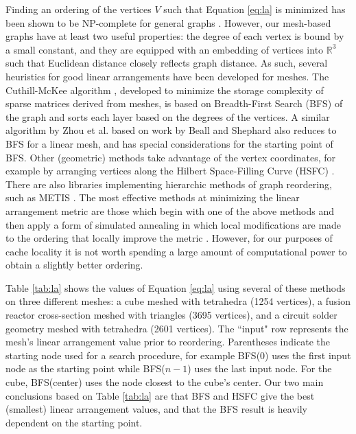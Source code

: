Finding an ordering of the vertices $V$ such that Equation \ref{eq:la}
is minimized has been shown to be NP-complete for general
graphs \cite{garey1976some}.
However, our mesh-based graphs have at least two useful properties:
the degree of each vertex is bound by a small constant,
and they are equipped with an embedding of vertices into $\mathbb{R}^3$
such that Euclidean distance closely reflects graph distance.
As such, several heuristics for good linear arrangements have been developed
for meshes.
The Cuthill-McKee algorithm \cite{cuthill1969reducing},
developed to minimize the storage complexity of sparse matrices
derived from meshes, is based on
Breadth-First Search (BFS) of the graph and sorts each layer based
on the degrees of the vertices.
A similar algorithm by Zhou et al. \cite{zhou2010adjacency} based
on work by Beall and Shephard \cite{beall1997general} also
reduces to BFS for a linear mesh, and has special considerations
for the starting point of BFS.
Other (geometric) methods take advantage of the vertex coordinates,
for example by arranging vertices along the Hilbert Space-Filling Curve
(HSFC) \cite{devine2005new}.
There are also libraries implementing hierarchic methods of
graph reordering, such as METIS \cite{METIS}.
The most effective methods at minimizing the linear arrangement metric
are those which begin with one of the above methods and then apply
a form of simulated annealing in which local modifications are made
to the ordering that locally improve the metric \cite{petit2003experiments}.
However, for our purposes of cache locality it is not worth
spending a large amount of computational power to obtain a slightly
better ordering.

Table \ref{tab:la} shows the values of Equation \ref{eq:la} using
several of these methods on three different meshes:
a cube meshed with tetrahedra (1254 vertices), a fusion reactor
cross-section meshed with triangles (3695 vertices), and
a circuit solder geometry meshed with tetrahedra (2601 vertices).
The ``input" row represents the mesh's linear arrangement value
prior to reordering.
Parentheses indicate the starting node used for a search procedure,
for example BFS(0) uses the first input node as the starting point
while BFS($n-1$) uses the last input node.
For the cube, BFS(center) uses the node closest to the cube's center.
Our two main conclusions based on Table \ref{tab:la} are that
BFS and HSFC give the best (smallest) linear arrangement values,
and that the BFS result is heavily dependent on the starting point.

